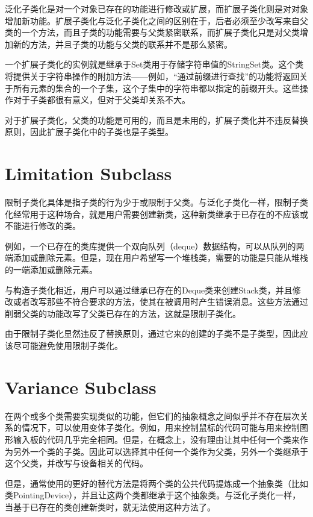 泛化子类化是对一个对象已存在的功能进行修改或扩展，而扩展子类化则是对对象增加新功能。扩展子类化与泛化子类化之间的区别在于，后者必须至少改写来自父类的一个方法，而且子类的功能需要与父类紧密联系，而扩展子类化只是对父类增加新的方法，并且子类的功能与父类的联系并不是那么紧密。

一个扩展子类化的实例就是继承于Set类用于存储字符串值的StringSet类。这个类将提供关于字符串操作的附加方法——例如，“通过前缀进行查找”的功能将返回关于所有元素的集合的一个子集，这个子集中的字符串都以指定的前缀开头。这些操作对于子类都很有意义，但对于父类却关系不大。

对于扩展子类化，父类的功能是可用的，而且是未用的，扩展子类化并不违反替换原则，因此扩展子类化中的子类也是子类型。

\section{Limitation Subclass}

限制子类化具体是指子类的行为少于或限制于父类。与泛化子类化一样，限制子类化经常用于这种场合，就是用户需要创建新类，这种新类继承于已存在的不应该或不能进行修改的类。

例如，一个已存在的类库提供一个双向队列（deque）数据结构，可以从队列的两端添加或删除元素。但是，现在用户希望写一个堆栈类，需要的功能是只能从堆栈的一端添加或删除元素。

与构造子类化相近，用户可以通过继承已存在的Deque类来创建Stack类，并且修改或者改写那些不符合要求的方法，使其在被调用时产生错误消息。这些方法通过削弱父类的功能改写了父类已存在的方法，这就是限制子类化。

由于限制子类化显然违反了替换原则，通过它来的创建的子类不是子类型，因此应该尽可能避免使用限制子类化。


\section{Variance Subclass}



在两个或多个类需要实现类似的功能，但它们的抽象概念之间似乎并不存在层次关系的情况下，可以使用变体子类化。例如，用来控制鼠标的代码可能与用来控制图形输入板的代码几乎完全相同。但是，在概念上，没有理由让其中任何一个类来作为另外一个类的子类。因此可以选择其中任何一个类作为父类，另外一个类继承于这个父类，并改写与设备相关的代码。



但是，通常使用的更好的替代方法是将两个类的公共代码提炼成一个抽象类（比如类PointingDevice），并且让这两个类都继承于这个抽象类。与泛化子类化一样，当基于已存在的类创建新类时，就无法使用这种方法了。

